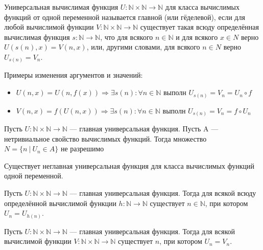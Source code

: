 \documentclass{article}
\newcommand{\then}{\Rightarrow}
\newcommand{\N}{\mathbb{N}}
\newenvironment{theorem}[2][Теорема]{\begin{trivlist}
\item[\hskip \labelsep {\bfseries #1}\hskip \labelsep {\bfseries #2.}]}{\end{trivlist}}
\newenvironment{definition}[2][Определение]{\begin{trivlist}
\item[\hskip \labelsep {\bfseries #1}\hskip \labelsep {\bfseries #2}]}{\end{trivlist}}
\begin{document}
\begin{definition}{УВФ}
Универсальная вычислимая функция $U : \N \times \N \to \N$ для класса вычислимых функций от одной переменной называется главной (или гёделевой),
если для любой вычислимой функции $V : \N \times \N \to \N$ существует такая всюду определённая вычислимая функция $s: \N \to \N$, что для всякого $n \in \N$ и для всякого
$x \in N$ верно $U(s(n), x) = V (n, x)$, или, другими словами, для всякого $n \in N$ верно
$U_{s(n)} = V_n$.

Примеры изменения аргументов и значений:
\begin{itemize}
\item $U(n, x) = U(n, f(x)) \then \exists s(n) : \forall n \in \N \text{ выполн } U_{s(n)} = V_n = U_n \circ f$
\item $V(n, x) = f(U(n, x)) \then \exists s(n) : \forall n \in \N \text{ выполн } U_{s(n)} = V_n = f \circ U_n$
\end{itemize}
\end{definition}

\begin{theorem}{Райса – Успенского}
Пусть $U : \N \times \N \to \N$ — главная универсальная функция. Пусть A — нетривиальное свойство вычислимых функций.
Тогда множество
$
N = \{n~|~ U_n \in A\}
$
не разрешимо
\end{theorem}

\begin{theorem}{Неглавная УФ}
Существует неглавная универсальная функция для класса вычислимых функций одной переменной.
\end{theorem}


\begin{theorem}{Неподвижная точка}
Пусть $U : \N \times \N \to \N$ — главная универсальная функция. Тогда для
всякой всюду определённой вычислимой функции $h: \N \to \N$ существует $n \in \N$, при
котором $U_n = U_{h(n)}$.
\end{theorem}

\begin{definition}{Следствие из неп точки.}
Пусть $U : \N\times\N \to \N$ — главная универсальная функция. Тогда для
всякой вычислимой функции $V : \N \times \N \to \N$ существует $n$, при котором $U_n = V_n$.
\end{definition}
\end{document}
